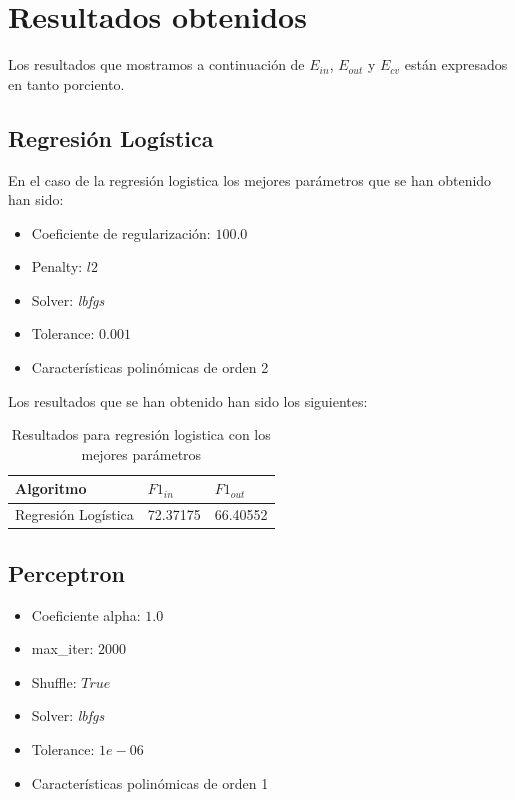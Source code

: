 \documentclass[11pt]{article}
\begin{document}
\section{Resultados obtenidos}

Los resultados que mostramos a continuación de $E_{in}$, $E_{out}$ y $E_{cv}$ están expresados en tanto porciento.

\subsection{Regresión Logística}

En el caso de la regresión logistica los mejores parámetros que se han obtenido 
han sido:

\begin{itemize}
    \item Coeficiente de regularización: $100.0$
    \item Penalty: $l2$
    \item Solver: \textit{lbfgs}
    \item Tolerance: $0.001$
    \item Características polinómicas de orden 2
\end{itemize}

Los resultados que se han obtenido han sido los siguientes:

\begin{table}[h!]
\centering
\begin{tabular}{|l|l|l|}
\hline
Algoritmo    & $F1_{in}$  & $F1_{out}$ \\ \hline
 Regresión Logística   & 72.37175  & 66.40552 \\ \hline
\end{tabular}
\caption{Resultados para regresión logistica con los mejores parámetros}
\end{table}

\subsection{Perceptron}

\begin{itemize}
    \item Coeficiente alpha: $1.0$
    \item max\_iter: $2000$
    \item Shuffle: $True$
    \item Solver: \textit{lbfgs}
    \item Tolerance: $1e-06$
    \item Características polinómicas de orden 1
\end{itemize}
\end{document}
